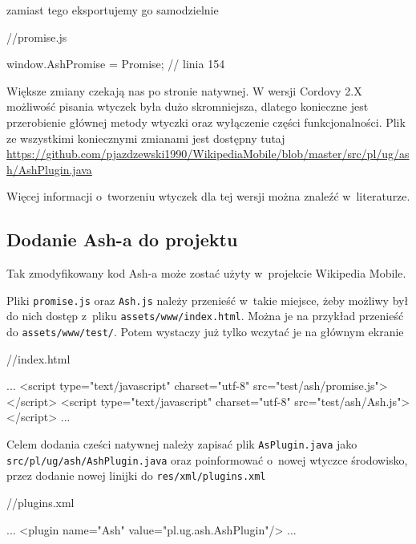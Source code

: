 \documentclass[brudnopis]{xmgr}
\begin{document}
zamiast tego eksportujemy go samodzielnie 

\begin{javascriptcode}
   //promise.js
  
  window.AshPromise = Promise;   // linia 154

\end{javascriptcode}

Większe zmiany czekają nas po stronie natywnej. W wersji Cordovy 2.X możliwość pisania wtyczek była dużo skromniejsza, dlatego konieczne jest przerobienie głównej metody wtyczki oraz wyłączenie części funkcjonalności. Plik ze wszystkimi koniecznymi zmianami jest dostępny tutaj \url{https://github.com/pjazdzewski1990/WikipediaMobile/blob/master/src/pl/ug/ash/AshPlugin.java}

Więcej informacji o~tworzeniu wtyczek dla tej wersji można znaleźć w~literaturze\cite{Ghatol-Patel}.

\subsection{Dodanie Ash-a do projektu}

Tak zmodyfikowany kod Ash-a może zostać użyty w~projekcie Wikipedia Mobile.

Pliki \texttt{promise.js} oraz \texttt{Ash.js} należy przenieść w~takie miejsce, żeby możliwy był do nich dostęp z~pliku \texttt{assets/www/index.html}. Można je na przykład przenieść do \texttt{assets/www/test/}. Potem wystaczy już tylko wczytać je na głównym ekranie 

\begin{htmlcode}
   //index.html
  
  ...
  <script type="text/javascript" 
        charset="utf-8" src="test/ash/promise.js"></script>
  <script type="text/javascript" 
        charset="utf-8" src="test/ash/Ash.js"></script>
  ...

\end{htmlcode}

Celem dodania cześci natywnej należy zapisać plik \texttt{AsPlugin.java} jako \texttt{src/pl/ug/ash/AshPlugin.java} oraz poinformować o~nowej wtyczce środowisko, przez dodanie nowej linijki do \texttt{res/xml/plugins.xml}

\begin{htmlcode}
   //plugins.xml
  
  ...
  <plugin name="Ash" value="pl.ug.ash.AshPlugin"/>
  ...

\end{htmlcode}
\end{document}
